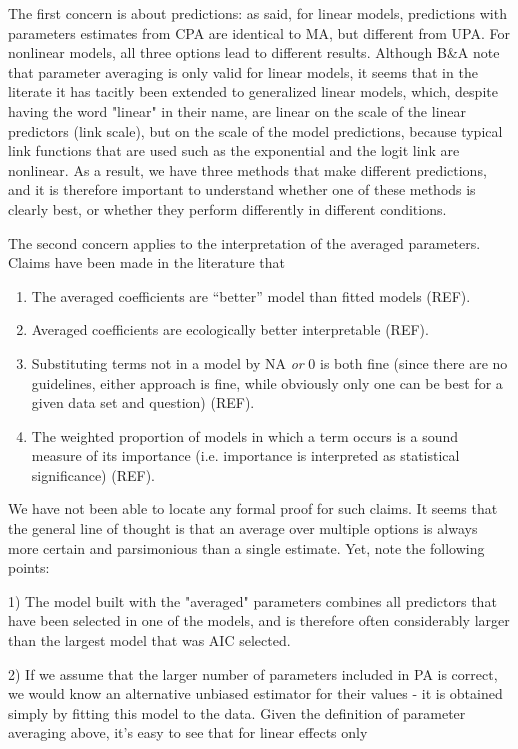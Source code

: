 \documentclass[5p]{elsarticle}
\begin{document}
The first concern is about predictions: as said, for linear models, predictions with parameters estimates from CPA are identical to MA, but different from UPA. For nonlinear models, all three options lead to different results. Although B\&A note that parameter averaging is only valid for linear models, it seems that in the literate it has tacitly been extended to generalized linear models, which, despite having the word "linear" in their name, are linear on the scale of the linear predictors (link scale), but on the scale of the model predictions, because typical link functions that are used such as the exponential and the logit link are nonlinear. As a result, we have three methods that make different predictions, and it is therefore important to understand whether one of these methods is clearly best, or whether they perform differently in different conditions. 

The second concern applies to the interpretation of the averaged parameters. Claims have been made in the literature that 
 
\begin{enumerate}
\item The averaged coefficients are ``better'' model than fitted models (REF).
\item Averaged coefficients are ecologically better interpretable (REF).
\item Substituting terms not in a model by NA \emph{or} 0 is both fine (since there are no guidelines, either approach is fine, while obviously only one can be best for a given data set and question) (REF).
\item The weighted proportion of models in which a term occurs is a sound measure of its importance (i.e. importance is interpreted as statistical significance) (REF).
\end{enumerate}

We have not been able to locate any formal proof for such claims. It seems that the general line of thought is that an average over multiple options is always more certain and parsimonious than a single estimate. Yet, note the following points: 

1) The model built with the "averaged" parameters combines all predictors that have been selected in one of the models, and is therefore often considerably larger than the largest model that was AIC selected. 

2) If we assume that the larger number of parameters included in PA is correct, we would know an alternative unbiased estimator for their values - it is obtained simply by fitting this model to the data. Given the definition of parameter averaging above, it's easy to see that for linear effects only
\end{document}

